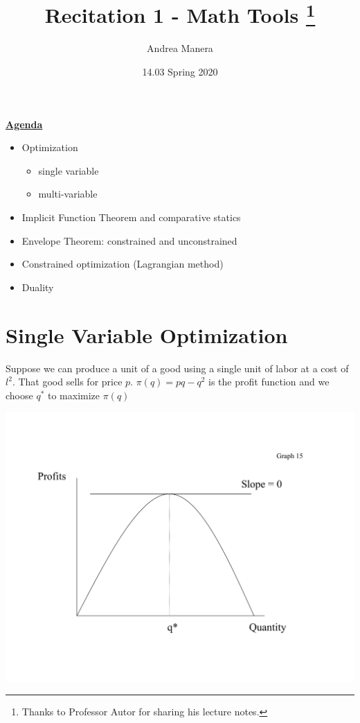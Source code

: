 \documentclass[11pt,english]{article}
\begin{document}
\title{Recitation 1 - Math Tools \thanks{Thanks to
    Professor Autor for sharing his lecture notes.}}
\author{Andrea Manera}
\date{14.03 Spring 2020}
\maketitle

\underline{\textbf{Agenda}}

\begin{itemize}
\item Optimization

\begin{itemize}
\item single variable

\item multi-variable
\end{itemize}

\item Implicit Function Theorem and comparative statics

\item Envelope Theorem: constrained and unconstrained

\item Constrained optimization (Lagrangian method)

\item Duality
\end{itemize}

\newpage

\bigskip

\section{Single Variable Optimization}

Suppose we can produce a unit of a good using a single unit of labor at a cost of $l^2$. That good sells for price $p$.  $\pi (q)=pq-q^2$ is the profit function and we choose $q^{\ast }$ to maximize $%
\pi (q)$

\bigskip

\includegraphics[scale=0.6]{math1.pdf}
\end{document}
